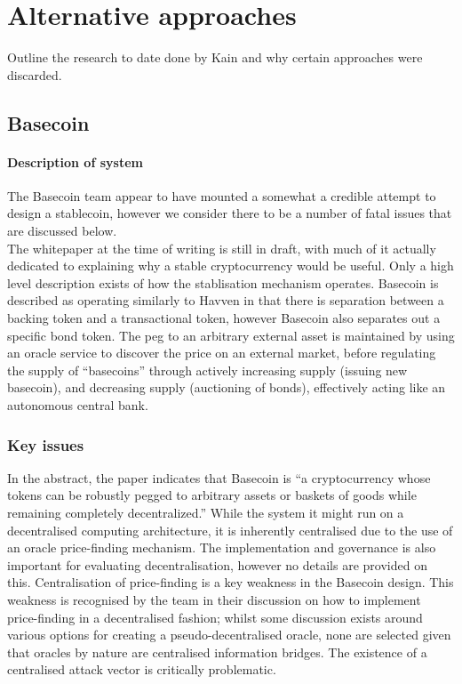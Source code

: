\section{Alternative approaches}

Outline the research to date done by Kain and why certain approaches were discarded.



\subsection{Basecoin}

\paragraph{Description of system}

The Basecoin team appear to have mounted a somewhat a credible attempt to design a stablecoin, however we consider there to be a number of fatal issues that are discussed below. \\

\noindent The whitepaper at the time of writing is still in draft, with much of it actually dedicated to explaining why a stable cryptocurrency would be useful. Only a high level description exists of how the stablisation mechanism operates. Basecoin is described as operating similarly to Havven in that there is separation between a backing token and a transactional token, however Basecoin also separates out a specific bond token. The peg to an arbitrary external asset is maintained by using an oracle service to discover the price on an external market, before regulating the supply of ``basecoins'' through actively increasing supply (issuing new basecoin), and decreasing supply (auctioning of bonds), effectively acting like an autonomous central bank. \\

\subsubsection{Key issues}

\noindent In the abstract, the paper indicates that Basecoin is ``a cryptocurrency whose tokens can be robustly pegged to arbitrary assets or baskets of goods while remaining completely decentralized.'' While the system it might run on a decentralised computing architecture, it is inherently centralised due to the use of an oracle price-finding mechanism. The implementation and governance is also important for evaluating decentralisation, however no details are provided on this. Centralisation of price-finding is a key weakness in the Basecoin design. This weakness is recognised by the team in their discussion on how to implement price-finding in a decentralised fashion; whilst some discussion exists around various options for creating a pseudo-decentralised oracle, none are selected given that oracles by nature are centralised information bridges. The existence of a centralised attack vector is critically problematic. \\

